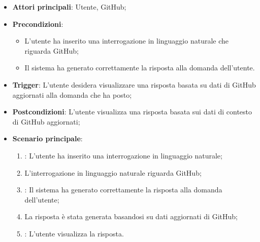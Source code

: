 \hypertarget{UC11.1}{}

\begin{itemize}
    \item \textbf{Attori principali}: Utente, GitHub;
    \item \textbf{Precondizioni}: 
    \begin{itemize}
        \item L'utente ha inserito una interrogazione in linguaggio naturale che riguarda GitHub;
        \item Il sistema ha generato correttamente la risposta alla domanda dell'utente.
    \end{itemize}
    \item \textbf{Trigger}: L'utente desidera visualizzare una risposta basata su dati di GitHub aggiornati alla domanda che ha posto;
    \item \textbf{Postcondizioni}: L'utente visualizza una risposta basata sui dati di contesto di GitHub aggiornati;
    \item \textbf{Scenario principale}: 
    \begin{enumerate}
        \item {}: L'utente ha inserito una interrogazione in linguaggio naturale;
        \item L'interrogazione in linguaggio naturale riguarda GitHub;
        \item {}: Il sistema ha generato correttamente la risposta alla domanda dell'utente;
        \item La risposta è stata generata basandosi su dati aggiornati di GitHub;
        \item {}: L'utente visualizza la risposta.
    \end{enumerate}
\end{itemize}



\hypertarget{UC11.2}{}

